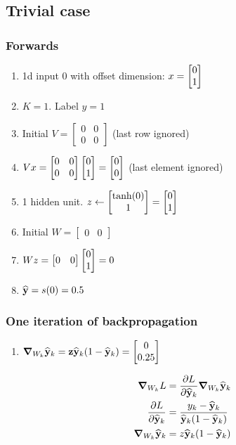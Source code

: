 \subsection{Trivial case}

\newcommand{\matrixiijj}[4]{\begin{bmatrix}#1 & #3\\#2 & #4\end{bmatrix}}
\newcommand{\matrixijj}[2]{\begin{bmatrix}#1 & #2\end{bmatrix}}

\subsubsection{Forwards}

\begin{enumerate}
\item 1d input 0 with offset dimension: $x=\begin{bmatrix}0\\1\end{bmatrix}$
\item $K=1$. Label $y = 1$
\item Initial $V = \matrixiijj{0}{0}{0}{0}$ (last row ignored)
\item $Vx = \matrixiijj{0}{0}{0}{0} \cvec{0}{1} = \cvec{0}{0}$ (last element ignored)
\item 1 hidden unit. $z \leftarrow \begin{bmatrix}\tanh(0)\\1\end{bmatrix} = \begin{bmatrix}0\\1\end{bmatrix}$
\item Initial $W = \matrixijj{0}{0}$
\item $Wz = \matrixijj{0}{0} \cvec{0}{1} = 0$
\item $\mathbf{\widehat{y}} = s(0) = 0.5$
\end{enumerate}

\subsubsection{One iteration of backpropagation}

\begin{enumerate}
\item $\grad_{W_k} \mathbf{\widehat{y}}_k = \mathbf z \mathbf{\widehat{y}}_k(1 - \mathbf{\widehat{y}}_k) = \begin{bmatrix}0\\0.25\end{bmatrix}$
\end{enumerate}

\begin{align*}
  \grad_{W_k} L &= \frac{\partial L}{\partial \mathbf{\widehat{y}}_k} \grad_{W_k} \mathbf{\widehat{y}}_k \\
  \frac{\partial L}{\partial \mathbf{\widehat{y}}_k} &= \frac{y_k - \mathbf{\widehat{y}}_k}{\mathbf{\widehat{y}}_k (1 - \mathbf{\widehat{y}}_k)} \\
  \grad_{W_k} \mathbf{\widehat{y}}_k &= z \mathbf{\widehat{y}}_k (1 - \mathbf{\widehat{y}}_k) \\
\end{align*}

